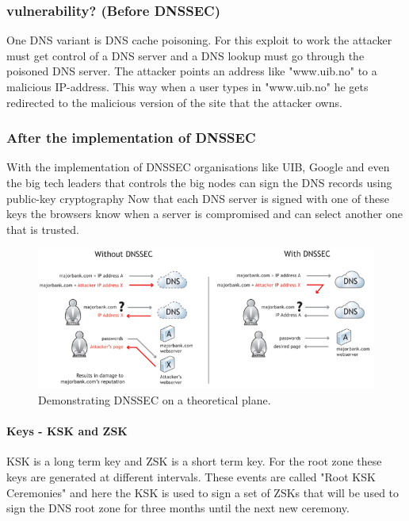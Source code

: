 \documentclass{article}
\begin{document}
	        \subsubsection{vulnerability? (Before DNSSEC)}
	        One DNS variant is DNS cache poisoning. For this exploit to work the attacker must get control of a DNS server and a DNS lookup must go through the poisoned DNS server. The attacker points an address like "www.uib.no" to a malicious IP-address. This way when a user types in "www.uib.no" he gets redirected to the malicious version of the site that the attacker owns.\cite{bellovin}
	        \subsubsection{After the implementation of DNSSEC}
	        With the implementation of DNSSEC organisations like UIB, Google and even the big tech leaders that controls the big nodes can sign the DNS records using public-key cryptography\cite{icann}
	        Now that each DNS server is signed with one of these keys the browsers know when a server is compromised and can select another one that is trusted.\\
	        \begin{figure}[ht]
	        	\centering
	        	\includegraphics[width=1.0\textwidth]{dnsVsDnssec}
	        	\caption{Demonstrating DNSSEC on a theoretical plane.\cite{IcannDnssec}}
	        	\label{normal_case}
	        \end{figure}
				\paragraph{Keys - KSK and ZSK}
				KSK is a long term key and ZSK is a short term key. For the root zone these keys are generated at different intervals. These events are called "Root KSK Ceremonies" and here the KSK is used to sign a set of ZSKs that will be used to sign the DNS root zone for three months until the next new ceremony. \cite{iana}
\end{document}
